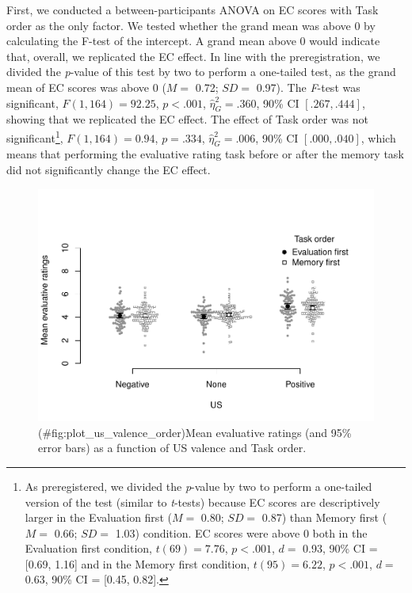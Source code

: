 \documentclass[
  man,floatsintext]{apa6}
\begin{document}
First, we conducted a between-participants ANOVA on EC scores with Task order as the only factor. We tested whether the grand mean was above 0 by calculating the F-test of the intercept. A grand mean above 0 would indicate that, overall, we replicated the EC effect. In line with the preregistration, we divided the \emph{p}-value of this test by two to perform a one-tailed test, as the grand mean of EC scores was above 0 (\(M =\) 0.72; \(SD =\) 0.97). The \emph{F}-test was significant, \(F(1, 164) = 92.25\), \(p < .001\), \(\hat{\eta}^2_G = .360\), 90\% CI \([.267, .444]\), showing that we replicated the EC effect. The effect of Task order was not significant\footnote{As preregistered, we divided the \emph{p}-value by two to perform a one-tailed version of the test (similar to \emph{t}-tests) because EC scores are descriptively larger in the Evaluation first (\(M =\) 0.80; \(SD =\) 0.87) than Memory first (\(M =\) 0.66; \(SD =\) 1.03) condition. EC scores were above 0 both in the Evaluation first condition, \(t(69) = 7.76\), \(p < .001\), \(d =\) 0.93, 90\% CI = {[}0.69, 1.16{]} and in the Memory first condition, \(t(95) = 6.22\), \(p < .001\), \(d =\) 0.63, 90\% CI = {[}0.45, 0.82{]}.}, \(F(1, 164) = 0.94\), \(p = .334\), \(\hat{\eta}^2_G = .006\), 90\% CI \([.000, .040]\), which means that performing the evaluative rating task before or after the memory task did not significantly change the EC effect.

\begin{figure}
\centering
\includegraphics{main_files/figure-latex/plot_us_valence_order-1.pdf}
\caption{(\#fig:plot\_us\_valence\_order)Mean evaluative ratings (and 95\% error bars) as a function of US valence and Task order.}
\end{figure}
\end{document}
